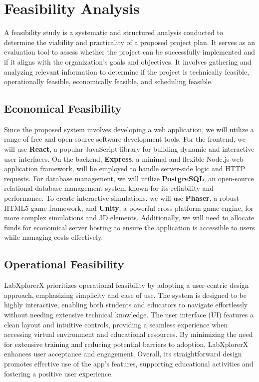 \section{Feasibility Analysis}
A feasibility study is a systematic and structured analysis conducted to determine the viability and practicality of a proposed project plan. It serves as an evaluation tool to assess whether the project can be successfully implemented and if it aligns with the organization's goals and objectives. It involves gathering and analyzing relevant information to determine if the project is technically feasible, operationally feasible, economically feasible, and scheduling feasible.
\subsection{Economical Feasibility}
Since the proposed system involves developing a web application, we will utilize a range of free and open-source software development tools. For the frontend, we will use \textbf{React}, a popular JavaScript library for building dynamic and interactive user interfaces. On the backend, \textbf{Express}, a minimal and flexible Node.js web application framework, will be employed to handle server-side logic and HTTP requests. For database management, we will utilize \textbf{PostgreSQL}, an open-source relational database management system known for its reliability and performance. To create interactive simulations, we will use \textbf{Phaser}, a robust HTML5 game framework, and \textbf{Unity}, a powerful cross-platform game engine, for more complex simulations and 3D elements. Additionally, we will need to allocate funds for economical server hosting to ensure the application is accessible to users while managing costs effectively.
\subsection{Operational Feasibility}
LabXplorerX prioritizes operational feasibility by adopting a user-centric design approach, emphasizing simplicity and ease of use. The system is designed to be highly interactive, enabling both students and educators to navigate effortlessly without needing extensive technical knowledge. The user interface (UI) features a clean layout and intuitive controls, providing a seamless experience when accessing virtual environment and educational resources. By minimizing the need for extensive training and reducing potential barriers to adoption, LabXplorerX enhances user acceptance and engagement. Overall, its straightforward design promotes effective use of the app's features, supporting educational activities and fostering a positive user experience.
